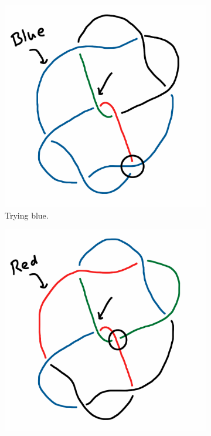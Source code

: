 \documentclass[12pt,letterpaper]{article}
\theoremstyle{definition}
\begin{document}
\begin{figure}
    \centering
    \begin{subfigure}{.3\textwidth}
        \centering
        \includegraphics[width=\textwidth]{knotpics/colorable2.png}
        \caption{Trying blue.}
    \end{subfigure}
    \quad
    \begin{subfigure}{.3\textwidth}
        \centering
        \includegraphics[width=\textwidth]{knotpics/colorable3.png}

\end{subfigure}
\end{figure}
\end{document}
